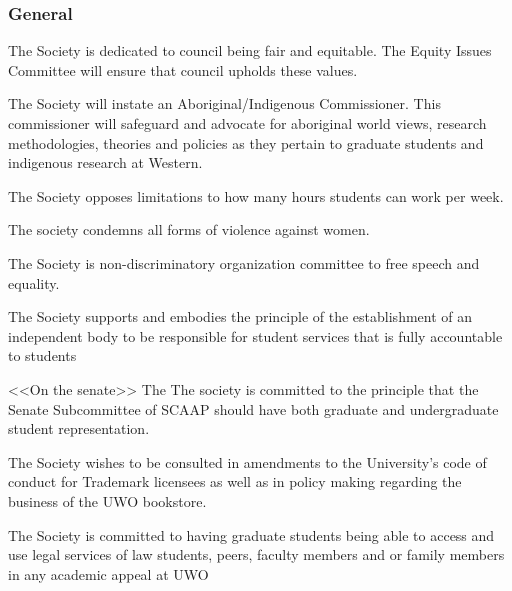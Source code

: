 \subsubsection{General}
\begin{longenum}[ label*=\thesubsubsection.\arabic*., align=left]
\item The Society is dedicated to council being fair and equitable. The Equity Issues Committee will ensure that council upholds these values. 
\item The Society will instate an Aboriginal/Indigenous Commissioner. This commissioner will safeguard and advocate for aboriginal world views, research methodologies, theories and policies as they pertain to graduate students and indigenous research at Western.
\item The Society opposes limitations to how many hours students can work per week.
\item The society condemns all forms of violence against women. 
\item The Society is non-discriminatory organization committee to free speech and equality.
\item The Society supports and embodies the principle of the establishment of an independent body to be responsible  for student services that is fully accountable to students 
\item <<On the senate>> The The society  is committed to the principle that the Senate Subcommittee of SCAAP should have both graduate and undergraduate student representation. 
\item The Society wishes to be consulted in amendments to the University's code of conduct for Trademark licensees as well as in policy making regarding the business of the UWO bookstore. 
\item The Society is committed to having graduate students being able to access and use legal services of law students, peers, faculty members and or family members in any academic appeal at UWO 
\end{longenum}


